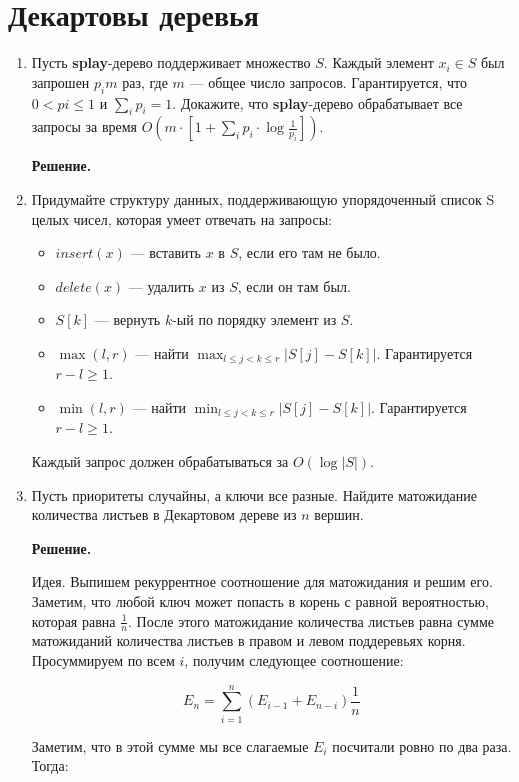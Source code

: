 \section*{Декартовы деревья}
\begin{enumerate}
	\item Пусть \textbf{splay}-дерево поддерживает множество $S$. Каждый элемент $x_i \in S$ был запрошен $p_im$ раз, где $m$ — общее число запросов. 
	Гарантируется, что $0 < pi \leqslant 1$ и $\sum_ip_i = 1$. Докажите, что \textbf{splay}-дерево обрабатывает все запросы за время $O(m\cdot \left[1 + \sum_ip_i\cdot \log \frac{1}{p_i} \right])$.

	\textbf{Решение.} 
	
	
	
	\item Придумайте структуру данных, поддерживающую упорядоченный список S целых чисел, которая
	умеет отвечать на запросы:
	\begin{itemize}
		\item $insert(x)$ — вставить $x$ в $S$, если его там не было.
		\item $delete(x)$ — удалить $x$ из $S$, если он там был.
		\item $S[k]$ — вернуть $k$-ый по порядку элемент из $S$.
		\item $\max(l, r)$ — найти $\max_{l\leqslant j<k\leqslant r} |S[j] - S[k]|$. Гарантируется $r - l \geqslant 1$.
		\item $\min(l, r)$ — найти $\min_{l\leqslant j<k\leqslant r} |S[j] - S[k]|$. Гарантируется $r - l \geqslant 1$.
	\end{itemize}
	
	Каждый запрос должен обрабатываться за $O(\log |S|)$.
	
	\item Пусть приоритеты случайны, а ключи все разные. Найдите матожидание количества листьев в
	Декартовом дереве из $n$ вершин.
	
	\textbf{Решение.}
	
	Идея. Выпишем рекуррентное соотношение для матожидания и решим его.
	Заметим, что любой ключ может попасть в корень с равной вероятностью, которая равна 
	$\frac{1}{n}$. После этого матожидание количества листьев равна сумме матожиданий количества листьев в правом и левом поддеревьях корня. Просуммируем по всем $i$, получим следующее соотношение:
	
	$$E_n = \sum\limits_{i = 1}^{n} (E_{i - 1} + E_{n - i}) \frac{1}{n}$$
	
	Заметим, что в этой сумме мы все слагаемые $E_i$ посчитали ровно по два раза. Тогда:
	

\end{enumerate}
